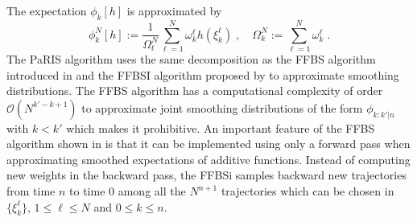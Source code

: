 \documentclass[12pt]{article}
\newcommand{\eqsp}{\;}
\newcommand{\1}{\mathrm{1}}
\begin{document}
The expectation $\phi_{k}[h]$ is approximated by
\[
\phi^N_{k}[h] := \frac{1}{\Omega_t^N} \sum_{\ell=1}^N \omega_k^{\ell} h \left(\xi^{\ell}_k \right)\eqsp,\quad\Omega_k^N:= \sum_{\ell=1}^N \omega_k^{\ell}\eqsp.
\]
The PaRIS algorithm uses the same decomposition as the FFBS algorithm introduced in \cite{doucetgodsillandrieu:2000} and the FFBSI algorithm proposed by \cite{godsill:doucet:west:2004} to approximate smoothing distributions. 
The FFBS algorithm has a computational complexity of order $\mathcal{O}(N^{k'-k+1})$ to approximate joint smoothing distributions of the form $\phi_{k:k'|n}$ with $k<k'$ which makes it prohibitive. An important feature of the FFBS algorithm shown in \cite{mongillo:deneve:2008,cappe:2011,delmoral:doucet:singh:2010} is that it can be implemented using only a forward pass when approximating smoothed expectations of additive functions. 
Instead of computing new weights in the backward pass, the FFBSi  samples backward new trajectories from time $n$ to time $0$ among all the $N^{n+1}$ trajectories which can be chosen in $\{\xi^{\ell}_k\}$, $1\le \ell\le N$ and $0\le k\le n$. 
\end{document}
